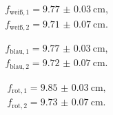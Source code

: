 \begin{gather*}
f_\mathrm{weiß, 1}= \SI{9.77(3)}{\centi\meter}\text{,}\\
f_\mathrm{weiß, 2}= \SI{9.71(7)}{\centi\meter}\text{.}
\end{gather*}

\begin{gather*}
f_\mathrm{blau, 1}= \SI{9.77(3)}{\centi\meter} \text{,}\\
f_\mathrm{blau, 2}= \SI{9.72(7)}{\centi\meter}\text{.}
\end{gather*}

\begin{gather*}
f_\mathrm{rot, 1}= \SI{9.85(3)}{\centi\meter}\text{,}\\
f_\mathrm{rot, 2}= \SI{9.73(7)}{\centi\meter}\text{.}
\end{gather*}
